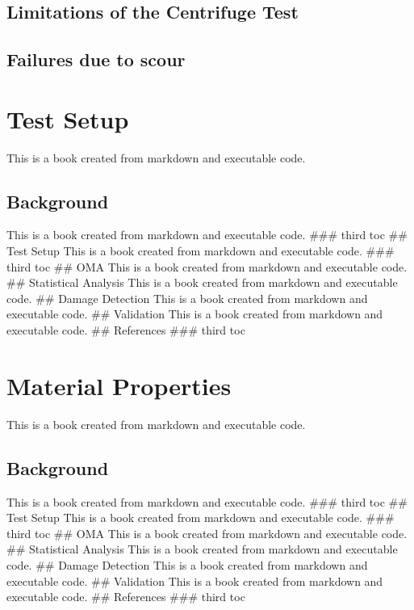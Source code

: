 \documentclass[
  letterpaper,
  DIV=11,
  numbers=noendperiod]{scrreprt}
\begin{document}
\hypertarget{limitations-of-the-centrifuge-test}{%
\section{Limitations of the Centrifuge
Test}\label{limitations-of-the-centrifuge-test}}

\hypertarget{failures-due-to-scour}{%
\section{Failures due to scour}\label{failures-due-to-scour}}

\hypertarget{test-setup}{%
\chapter{Test Setup}\label{test-setup}}

This is a book created from markdown and executable code.

\hypertarget{background-1}{%
\section{Background}\label{background-1}}

This is a book created from markdown and executable code. \#\#\# third
toc \#\# Test Setup This is a book created from markdown and executable
code. \#\#\# third toc \#\# OMA This is a book created from markdown and
executable code. \#\# Statistical Analysis This is a book created from
markdown and executable code. \#\# Damage Detection This is a book
created from markdown and executable code. \#\# Validation This is a
book created from markdown and executable code. \#\# References \#\#\#
third toc

\hypertarget{material-properties}{%
\chapter{Material Properties}\label{material-properties}}

This is a book created from markdown and executable code.

\hypertarget{background-2}{%
\section{Background}\label{background-2}}

This is a book created from markdown and executable code. \#\#\# third
toc \#\# Test Setup This is a book created from markdown and executable
code. \#\#\# third toc \#\# OMA This is a book created from markdown and
executable code. \#\# Statistical Analysis This is a book created from
markdown and executable code. \#\# Damage Detection This is a book
created from markdown and executable code. \#\# Validation This is a
book created from markdown and executable code. \#\# References \#\#\#
third toc
\end{document}
